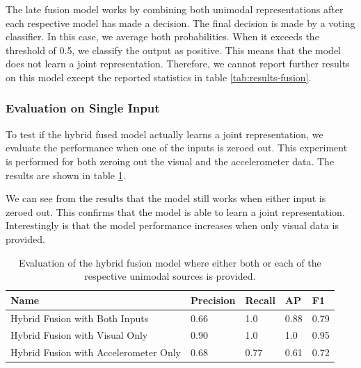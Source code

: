 The late fusion model works by combining both unimodal representations after each respective model has made a decision. The final decision is made by a voting classifier. In this case, we average both probabilities. When it exceeds the threshold of 0.5, we classify the output as positive. This means that the model does not learn a joint representation. Therefore, we cannot report further results on this model except the reported statistics in table \ref{tab:results-fusion}.






\subsubsection{Evaluation on Single Input}

To test if the hybrid fused model actually learns a joint representation, we evaluate the performance when one of the inputs is zeroed out. This experiment is performed for both zeroing out the visual and the accelerometer data. The results are shown in table \ref{tab:results-fusion-compare}.

We can see from the results that the model still works when either input is zeroed out. This confirms that the model is able to learn a joint representation. Interestingly is that the model performance increases when only visual data is provided.

\begin{table}[ht]
\centering
\begin{tabular}{|l|l|l|l|l|}
\hline
\textbf{Name}                         & \textbf{Precision} & \textbf{Recall} & \textbf{AP} & \textbf{F1} \\ \hline
Hybrid Fusion with Both Inputs      & 0.66               & 1.0             & 0.88        & 0.79          \\ \hline
Hybrid Fusion with Visual Only        & 0.90               & 1.0             & 1.0         & 0.95        \\ \hline
Hybrid Fusion with Accelerometer Only & 0.68               & 0.77            & 0.61        & 0.72        \\ \hline
\end{tabular}
\caption{Evaluation of the hybrid fusion model where either both or each of the respective unimodal sources is provided.}
\label{tab:results-fusion-compare}
\end{table}

